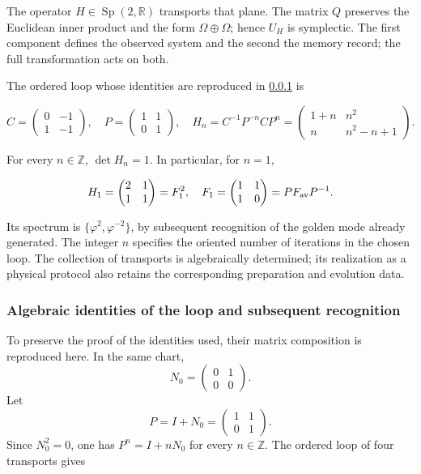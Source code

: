 The operator \(H\in\operatorname{Sp}(2,\mathbb R)\) transports that plane. The matrix \(Q\) preserves the Euclidean inner product and the form \(\Omega\oplus\Omega\); hence \(U_H\) is symplectic. The first component defines the observed system and the second the memory record; the full transformation acts on both.

The ordered loop whose identities are reproduced in
\ref{md:antmem:lazo-ep} is

\begin{equation}
C=\begin{pmatrix}0&-1\\1&-1\end{pmatrix},\quad
P=\begin{pmatrix}1&1\\0&1\end{pmatrix},\quad
H_n=C^{-1}P^{-n}CP^n
=\begin{pmatrix}1+n&n^2\\n&n^2-n+1\end{pmatrix}.
\label{md:antmem:cuantica:eq:5.2}
\end{equation}

For every \(n\in\mathbb Z\), \(\det H_n=1\). In particular, for \(n=1\),

\begin{equation}
H_1=\begin{pmatrix}2&1\\1&1\end{pmatrix}
=F_1^2,\quad F_1=\begin{pmatrix}1&1\\1&0\end{pmatrix}
=P F_{\rm av}P^{-1}.
\label{md:antmem:cuantica:eq:5.3}
\end{equation}

Its spectrum is \(\{\varphi^2,\varphi^{-2}\}\), by subsequent recognition of the golden mode already generated. The integer \(n\) specifies the oriented number of iterations in the chosen loop. The collection of transports is algebraically determined; its realization as a physical protocol also retains the corresponding preparation and evolution data.

\subsubsection{Algebraic identities of the loop and subsequent recognition}
\label{md:antmem:lazo-ep}
To preserve the proof of the identities used, their matrix
composition is reproduced here. In the same chart,
\[
 N_0=\begin{pmatrix}0&1\\0&0\end{pmatrix}.
\]
Let
\[
 P=I+N_0=\begin{pmatrix}1&1\\0&1\end{pmatrix}.
\]
Since \(N_0^2=0\), one has \(P^n=I+nN_0\) for every
\(n\in\mathbb Z\).
The ordered loop of four transports gives

